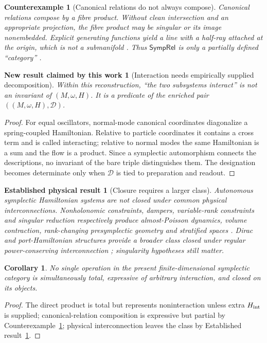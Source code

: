 \documentclass[12pt,a4paper]{article}
\theoremstyle{definition}
\theoremstyle{plain}
\newtheorem{corollary}[definition]{Corollary}
\theoremstyle{commentary}
\newtheorem{established}[definition]{Established physical result}
\newtheorem{newresult}[definition]{New result claimed by this work}
\newtheorem{counterexample}[definition]{Counterexample}
\newcommand{\SympRel}{\mathsf{SympRel}}
\begin{document}
\begin{counterexample}[Canonical relations do not always compose]\label{cex:relations}
Canonical relations compose by a fibre product.  Without clean intersection and an appropriate
projection, the fibre product may be singular or its image nonembedded.  Explicit generating
functions yield a line with a half-ray attached at the origin, which is not a submanifold
\cite{PilotI}.  Thus $\SympRel$ is only a partially defined ``category''
\cite{Weinstein1982,Weinstein2010}.
\end{counterexample}

\begin{newresult}[Interaction needs empirically supplied decomposition]\label{new:interaction}
Within this reconstruction, ``the two subsystems interact'' is not an invariant of
$(M,\omega,H)$.  It is a predicate of the enriched pair $((M,\omega,H),\mathcal D)$.
\end{newresult}
\begin{proof}
For equal oscillators, normal-mode canonical coordinates diagonalize a spring-coupled Hamiltonian.
Relative to particle coordinates it contains a cross term and is called interacting; relative to
normal modes the same Hamiltonian is a sum and the flow is a product.  Since a symplectic
automorphism connects the descriptions, no invariant of the bare triple distinguishes them.
The designation becomes determinate only when $\mathcal D$ is tied to preparation and readout.
\end{proof}

\begin{established}[Closure requires a larger class]\label{est:closure}
Autonomous symplectic Hamiltonian systems are not closed under common physical interconnections.
Nonholonomic constraints, dampers, variable-rank constraints and singular reduction respectively
produce almost-Poisson dynamics, volume contraction, rank-changing presymplectic geometry and
stratified spaces \cite{GotayNesterHinds1978,KoonMarsden1997,SjamaarLerman1991}.  Dirac and
port-Hamiltonian structures provide a broader class closed under regular power-conserving
interconnection \cite{Courant1990,Cervera2007}; singularity hypotheses still matter.
\end{established}

\begin{corollary}
No single operation in the present finite-dimensional symplectic category is simultaneously
total, expressive of arbitrary interaction, and closed on its objects.
\end{corollary}
\begin{proof}
The direct product is total but represents noninteraction unless extra $H_{\rm int}$ is supplied;
canonical-relation composition is expressive but partial by Counterexample~\ref{cex:relations};
physical interconnection leaves the class by Established result~\ref{est:closure}.
\end{proof}
\end{document}
